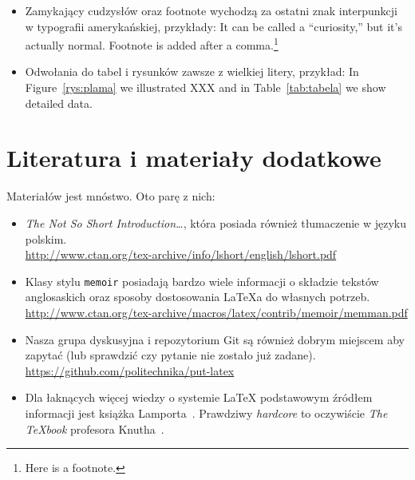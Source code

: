 \begin{itemize}
    \item Zamykający cudzysłów oraz footnote wychodzą za ostatni znak interpunkcji w typografii
    amerykańskiej, przykłady:
    It can be called a ``curiosity,'' but it's actually normal.
    Footnote is added after a comma.\footnote{Here is a footnote.}

    \item Odwołania do tabel i rysunków zawsze z wielkiej litery, przykład:
    In Figure~\ref{rys:plama} we illustrated XXX and in Table~\ref{tab:tabela} we show detailed data.

\end{itemize}


\section{Literatura i materiały dodatkowe}

Materiałów jest mnóstwo. Oto parę z nich:
\begin{itemize}
    \item \emph{The Not So Short Introduction\ldots}, która posiada również tłumaczenie
    w języku polskim.\\
    \url{http://www.ctan.org/tex-archive/info/lshort/english/lshort.pdf}

    \item Klasy stylu \texttt{memoir} posiadają bardzo wiele informacji o składzie tekstów
    anglosaskich oraz sposoby dostosowania \LaTeX{}a do własnych potrzeb.\\
    \url{http://www.ctan.org/tex-archive/macros/latex/contrib/memoir/memman.pdf}

    \item Nasza grupa dyskusyjna i repozytorium Git są również dobrym miejscem aby zapytać
    (lub sprawdzić czy pytanie nie zostało już zadane).\\
    \url{https://github.com/politechnika/put-latex}

    \item Dla łaknących więcej wiedzy o systemie LaTeX podstawowym źródłem informacji
    jest książka Lamporta~\cite{Lamport1985}. Prawdziwy \emph{hardcore} to oczywiście
    \emph{The \TeX{}book} profesora Knutha~\cite{Knuth1986}.
\end{itemize}

